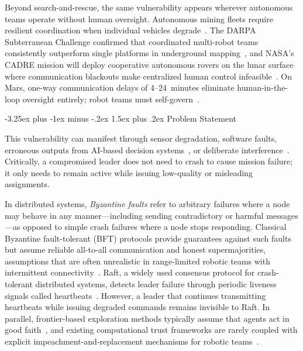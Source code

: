 \documentclass[conference]{IEEEtran}
\makeatletter
\renewcommand{\subsection}{\@startsection{subsection}{2}{\z@}%
  {-3.25ex plus -1ex minus -.2ex}%
  {1.5ex plus .2ex}%
  {\normalfont\normalsize\itshape\centering}}
\makeatother
\begin{document}
Beyond search-and-rescue, the same vulnerability appears wherever autonomous teams operate without human oversight. Autonomous mining fleets require resilient coordination when individual vehicles degrade~\cite{marshall2016robotics}. The DARPA Subterranean Challenge confirmed that coordinated multi-robot teams consistently outperform single platforms in underground mapping~\cite{chung2023darpa}, and NASA's CADRE mission will deploy cooperative autonomous rovers on the lunar surface where communication blackouts make centralized human control infeasible~\cite{delacroix2024cadre, whittaker2012lunar}. On Mars, one-way communication delays of 4--24~minutes eliminate human-in-the-loop oversight entirely; robot teams must self-govern~\cite{mcbrayer2022comm}.

\subsection{Problem Statement}

This vulnerability can manifest through sensor degradation, software faults, erroneous outputs from AI-based decision systems~\cite{ji2023hallucination}, or deliberate interference~\cite{douceur2002sybil}. Critically, a compromised leader does not need to crash to cause mission failure; it only needs to remain active while issuing low-quality or misleading assignments.

In distributed systems, \emph{Byzantine faults} refer to arbitrary failures where a node may behave in any manner---including sending contradictory or harmful messages---as opposed to simple crash failures where a node stops responding. Classical Byzantine fault-tolerant (BFT) protocols provide guarantees against such faults but assume reliable all-to-all communication and honest supermajorities, assumptions that are often unrealistic in range-limited robotic teams with intermittent connectivity~\cite{lamport1982byzantine, castro1999practical}. Raft, a widely used consensus protocol for crash-tolerant distributed systems, detects leader failure through periodic liveness signals called heartbeats~\cite{ongaro2014raft}. However, a leader that continues transmitting heartbeats while issuing degraded commands remains invisible to Raft. In parallel, frontier-based exploration methods typically assume that agents act in good faith~\cite{yamauchi1997frontier, burgard2000collaborative}, and existing computational trust frameworks are rarely coupled with explicit impeachment-and-replacement mechanisms for robotic teams~\cite{marsh1994formalising}.
\end{document}

